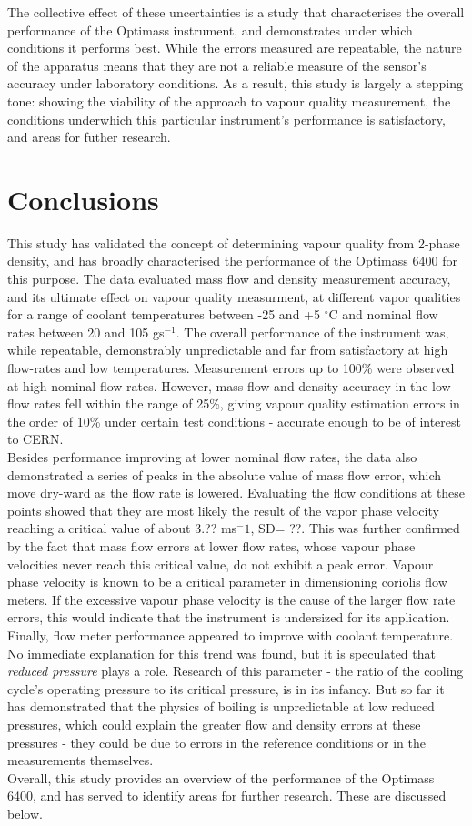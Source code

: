 \documentclass{report}
\begin{document}
The collective effect of these uncertainties is a study that characterises the overall performance of the Optimass instrument, and demonstrates under which conditions it performs best. While the errors measured are repeatable, the nature of the apparatus means that they are not a reliable measure of the sensor's accuracy under laboratory conditions. As a result, this study is largely a stepping tone: showing the viability of the approach to vapour quality measurement, the conditions underwhich this particular instrument's performance is satisfactory, and areas for futher research.
\chapter{Conclusions}
This study has validated the concept of determining vapour quality from 2-phase density, and has broadly characterised the performance of the Optimass 6400 for this purpose. The data evaluated mass flow and density measurement accuracy, and its ultimate effect on vapour quality measurment, at different vapor qualities for a range of coolant temperatures between -25 and +5 $^\circ$C and nominal flow rates between 20 and 105 gs$^{-1}$. The overall performance of the instrument was, while repeatable, demonstrably unpredictable and far from satisfactory at high flow-rates and low temperatures. Measurement errors up to 100\% were observed at high nominal flow rates. However, mass flow and density accuracy in the low flow rates fell within the range of 25\%, giving vapour quality estimation errors in the order of 10\% under certain test conditions - accurate enough to be of interest to CERN.\\
Besides performance improving at lower nominal flow rates, the data also demonstrated a series of peaks in the absolute value of mass flow error, which move dry-ward as the flow rate is lowered. Evaluating the flow conditions at these points showed that they are most likely the result of the vapor phase velocity reaching a critical value of about 3.?? ms$^-1$, SD= ??. This was further confirmed by the fact that mass flow errors at lower flow rates, whose vapour phase velocities never reach this critical value, do not exhibit a peak error. Vapour phase velocity is known to be a critical parameter in dimensioning coriolis flow meters. If the excessive vapour phase velocity is the cause of the larger flow rate errors, this would indicate that the instrument is undersized for its application.\\
Finally, flow meter performance appeared to improve with coolant temperature. No immediate explanation for this trend was found, but it is speculated that \textit{reduced pressure} plays a role. Research of this parameter - the ratio of the cooling cycle's operating pressure to its critical pressure, is in its infancy. But so far it has demonstrated that the physics of boiling is unpredictable at low reduced pressures, which could explain the greater flow and density errors at these pressures - they could be due to errors in the reference conditions or in the measurements themselves.\\
Overall, this study provides an overview of the performance of the Optimass 6400, and has served to identify areas for further research. These are discussed below.
\end{document}
